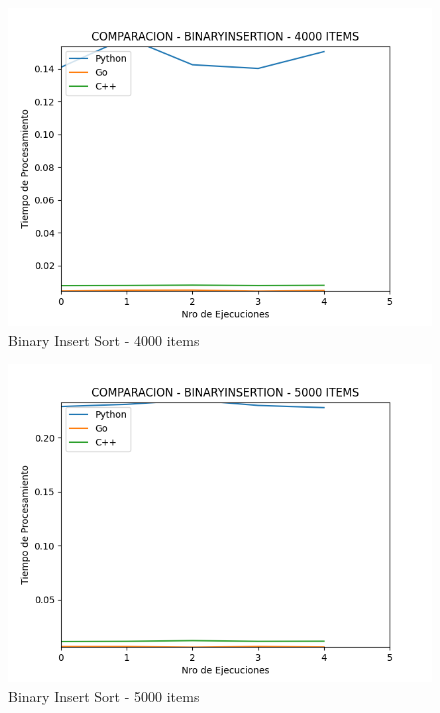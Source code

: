 \documentclass[12pt]{article} %
\begin{document}
    \vspace{5mm}
    
    \begin{figure}[H]
    \centering
    \includegraphics[width=\textwidth]{binaryInsertion_4000}
    \caption{Binary Insert Sort - 4000 items}
    \end{figure}

    \vspace{5mm}
    
    \begin{figure}[H]
    \centering
    \includegraphics[width=\textwidth]{binaryInsertion_5000}
    \caption{Binary Insert Sort - 5000 items}
    \end{figure}
\end{document}
